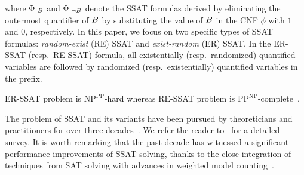 where $ \Phi|_{B} $ and $ \Phi|_{\neg B} $ denote the SSAT formulas derived by eliminating the outermost quantifier of $ B $  by substituting the value of $ B $ in the CNF $ \phi $ with $ 1 $ and $ 0 $, respectively. In this paper, we focus on two specific types of SSAT formulas:  \textit{random-exist} (RE) SSAT and \textit{exist-random} (ER) SSAT. In the ER-SSAT (resp.\ RE-SSAT) formula, all existentially (resp.\ randomized) quantified variables are followed by randomized (resp.\ existentially) quantified variables in the prefix.


\begin{remark}
	ER-SSAT problem is $\mathrm{NP}^{\mathrm{PP}}$-hard whereas RE-SSAT problem is $\mathrm{PP}^{\mathrm{NP}}$-complete~\cite{littman2001stochastic}.
\end{remark}



The problem of SSAT and its variants have been pursued by theoreticians and practitioners for over three decades~\cite{majercik2005dc,fremont2017maximum,huang2006combining}. We refer the reader to~\cite{lee2017solving,lee2018solving} for a detailed survey. It is worth remarking that the past decade has witnessed a significant performance improvements of SSAT solving, thanks to the close integration of techniques from SAT solving with advances in weighted model counting~\cite{sang2004combining,chakraborty2013scalable,chakraborty2014distribution}. 



